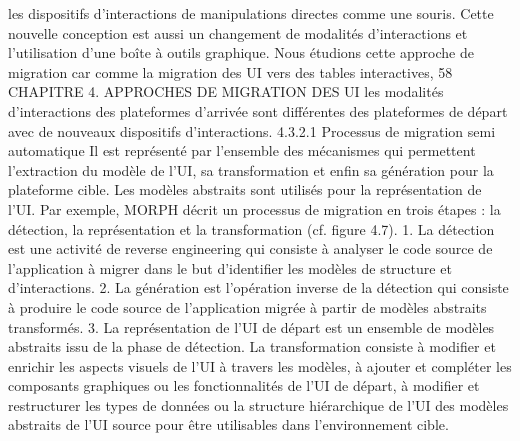 \documentclass{article}
\begin{document}
les dispositifs d’interactions de manipulations directes comme une souris. Cette nouvelle conception
est aussi un changement de modalit\'{e}s d’interactions et l’utilisation d’une bo\^{i}te \`{a} outils graphique.
Nous \'{e}tudions cette approche de migration car comme la migration des UI vers des tables interactives,
58
CHAPITRE 4. APPROCHES DE MIGRATION DES UI
les modalit\'{e}s d’interactions des plateformes d’arriv\'{e}e sont diff\'{e}rentes des plateformes de d\'{e}part avec
de nouveaux dispositifs d’interactions.
4.3.2.1
Processus de migration semi automatique
Il est repr\'{e}sent\'{e} par l’ensemble des m\'{e}canismes qui permettent l’extraction du mod\`{e}le de l’UI, sa
transformation et enﬁn sa g\'{e}n\'{e}ration pour la plateforme cible. Les mod\`{e}les abstraits sont utilis\'{e}s pour
la repr\'{e}sentation de l’UI. Par exemple, MORPH d\'{e}crit un processus de migration en trois \'{e}tapes : la
d\'{e}tection, la repr\'{e}sentation et la transformation (cf. ﬁgure 4.7).
1. La d\'{e}tection est une activit\'{e} de reverse engineering qui consiste \`{a} analyser le code source de
l’application \`{a} migrer dans le but d’identiﬁer les mod\`{e}les de structure et d’interactions.
2. La g\'{e}n\'{e}ration est l’op\'{e}ration inverse de la d\'{e}tection qui consiste \`{a} produire le code source de
l’application migr\'{e}e \`{a} partir de mod\`{e}les abstraits transform\'{e}s.
3. La repr\'{e}sentation de l’UI de d\'{e}part est un ensemble de mod\`{e}les abstraits issu de la phase de
d\'{e}tection. La transformation consiste \`{a} modiﬁer et enrichir les aspects visuels de l’UI \`{a} travers
les mod\`{e}les, \`{a} ajouter et compl\'{e}ter les composants graphiques ou les fonctionnalit\'{e}s de l’UI de
d\'{e}part, \`{a} modiﬁer et restructurer les types de donn\'{e}es ou la structure hi\'{e}rarchique de l’UI des
mod\`{e}les abstraits de l’UI source pour \^{e}tre utilisables dans l’environnement cible.
 
\end{document}
